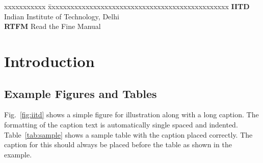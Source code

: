 \documentclass[Other]{iitddiss}
\begin{document}









\begin{singlespace}
\tableofcontents
\thispagestyle{empty}

\listoftables
{}
\listoffigures
{}
\end{singlespace}


\abbreviations

\noindent
\begin{tabbing}
xxxxxxxxxxx \= xxxxxxxxxxxxxxxxxxxxxxxxxxxxxxxxxxxxxxxxxxxxxxxx \kill
\textbf{IITD}   \> Indian Institute of Technology, Delhi \\
\textbf{RTFM} \> Read the Fine Manual \\
\end{tabbing}

\pagebreak

\pagebreak
\clearpage




\chapter{Introduction}
\label{chap:intro}

\section{Example Figures and Tables}

Fig.~\ref{fig:iitd} shows a simple figure for illustration along with
a long caption.  The formatting of the caption text is automatically
single spaced and indented.  Table~\ref{tab:sample} shows a sample
table with the caption placed correctly.  The caption for this should
always be placed before the table as shown in the example.
\end{document}
